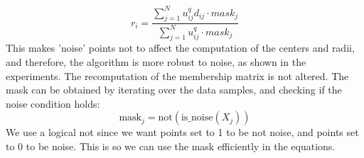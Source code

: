 \documentclass[conference]{IEEEtran}
\begin{document}
\begin{equation}\label{eq:r_i_new}
    r_i = \frac{\sum_{j=1}^{N} u_{ij}^q d_{ij} \cdot mask_j}{\sum_{j=1}^{N} u_{ij}^q \cdot mask_j}
\end{equation}
This makes 'noise' points not to affect the computation of the centers and radii, and therefore, the algorithm is more robust to noise, as shown in the experiments.
The recomputation of the membership matrix is not altered.
The mask can be obtained by iterating over the data samples, and checking if the noise condition holds:
\begin{equation}
    \text{mask}_j = \text{not}(\text{is\_noise}(X_j))
\end{equation}
We use a logical not since we want points set to 1 to be not noise, and points set to 0 to be noise. This is so we can use the mask efficiently in the equations.
\end{document}
